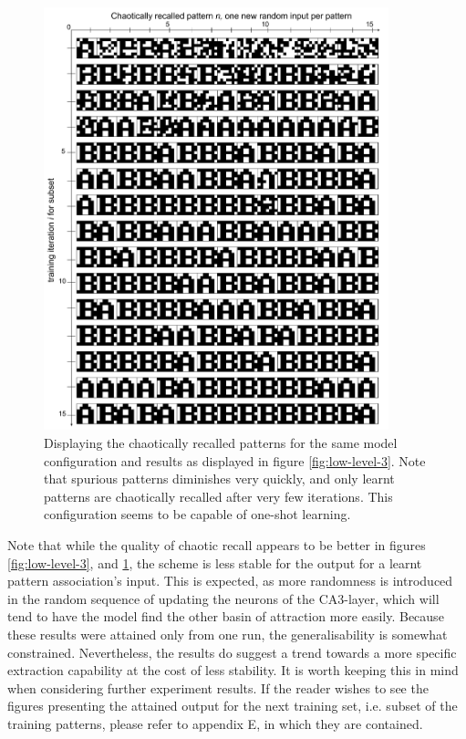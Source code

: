 \begin{figure}
    \centering
    \includegraphics[width=10cm]{fig/AB-chaotic-recall-async-tm0-dgw1-tau050}
    \caption{Displaying the chaotically recalled patterns for the same model configuration and results as displayed in figure \ref{fig:low-level-3}. Note that spurious patterns diminishes very quickly, and only learnt patterns are chaotically recalled after very few iterations. This configuration seems to be capable of one-shot learning.}
    \label{fig:low-level-4}
\end{figure}

Note that while the quality of chaotic recall appears to be better in figures \ref{fig:low-level-3}, and \ref{fig:low-level-4}, the scheme is less stable for the output for a learnt pattern association's input. This is expected, as more randomness is introduced in the random sequence of updating the neurons of the CA3-layer, which will tend to have the model find the other basin of attraction more easily. Because these results were attained only from one run, the generalisability is somewhat constrained. Nevertheless, the results do suggest a trend towards a more specific extraction capability at the cost of less stability. It is worth keeping this in mind when considering further experiment results. If the reader wishes to see the figures presenting the attained output for the next training set, i.e. subset of the training patterns, please refer to appendix E, in which they are contained.


